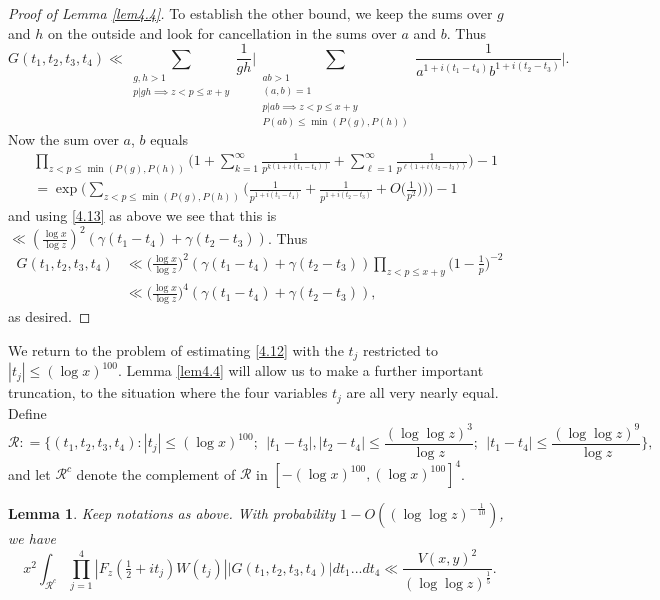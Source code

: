 \documentclass[12pt, notitlepage]{amsart}
\numberwithin{equation}{section}
\newtheorem{lemma}[theorem]{Lemma}
\theoremstyle{remark}
\theoremstyle{definition}
\theoremstyle{remark}
\numberwithin{equation}{section}
\begin{document}
\begin{proof}[Proof of Lemma \ref{lem4.4}]
 To establish the other bound, we keep the sums over $g$ and $h$ on the outside and look for cancellation in the sums over $a$ and $b$.  Thus 
 $$ 
 G(t_1, t_2, t_3, t_4) \ll \sum_{\substack{g, h >1 \\ p|gh \implies z < p\le x+y}} \frac{1}{gh} \Big| \sum_{\substack{ab > 1 \\ (a,b)=1 \\ p|ab \implies z < p\le x+y \\ P(ab) \le \min (P(g), P(h))}} \frac{1}{a^{1+i(t_1-t_4)} b^{1+i(t_2-t_3)}}\Big|. 
 $$ 
 Now the sum over $a$, $b$ equals 
 \begin{align*} 
 &\prod_{z < p \le \min(P(g),P(h))} \Big(1 + \sum_{k=1}^{\infty} 
 \frac{1}{p^{k(1+i(t_1-t_4))} }  + \sum_{\ell=1}^{\infty} \frac{1}{p^{\ell(1+i(t_2-t_3))}} \Big) - 1 
 \\
 &= \exp\Big( \sum_{z < p\le \min(P(g),P(h))} \Big(\frac{1}{p^{1+i(t_1-t_4)}} +\frac{1}{p^{1+i(t_2-t_3)}} +O\Big(\frac 1{p^2}\Big)\Big) \Big)-1 
 \end{align*}
 and using \eqref{4.13} as above we see that this is $\ll (\frac{\log x}{\log z})^{2} (\gamma(t_1-t_4) + \gamma(t_2-t_3))$.   Thus  
 \begin{align*}
 G(t_1, t_2, t_3, t_4) &\ll \Big(\frac{\log x}{\log z} \Big)^2 (\gamma(t_1-t_4) + \gamma(t_2-t_3)) \prod_{z < p \le x+y} \Big(1-\frac 1p\Big)^{-2}  \\
& \ll \Big(\frac{\log x}{\log z} \Big)^4  (\gamma(t_1-t_4) + \gamma(t_2-t_3)) , 
 \end{align*} 
as desired. 
 \end{proof}
 

We return to the problem of estimating \eqref{4.12} with the $t_j$ restricted to $|t_j| \le (\log x)^{100}$.   Lemma \ref{lem4.4} will allow us to make a further important truncation, to the situation where the four variables $t_j$ are all very nearly equal.   Define 
   \begin{equation*}
        \mathcal{R}: = \Big\{(t_1, t_2, t_3, t_4): |t_j| \le (\log x)^{100}; \ \  |t_1-t_3|, |t_2-t_4|\le \frac{(\log \log z)^{3}}{\log z}; \ \   |t_1-t_4|\le \frac{(\log \log z)^{9}}{\log z} \Big\}, 
    \end{equation*}
    and let ${\mathcal R}^{c}$ denote the complement of ${\mathcal R}$ in $[-(\log x)^{100}, (\log x)^{100}]^4$.   


 

\begin{lemma}\label{lem: R} Keep notations as above.  With probability $1-O((\log \log z)^{-\frac{1}{10}})$, we have
 \begin{equation}\label{eqn: Abadint}
 x^2\int_{ \mathcal{R}^c}   \prod_{j=1}^{4} |F_z(\tfrac{1}{2}+it_j)W(t_j)| |G(t_1,t_2,t_3,t_4)|  dt_1 ... dt_4  \ll \frac{V(x,y)^2}{(\log \log z)^{\frac{1}{5}}}. 
 \end{equation}
\end{lemma}
\end{document}
